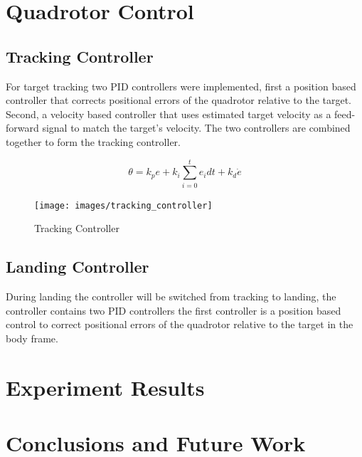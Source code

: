 \documentclass[letterpaper, 10 pt, conference]{ieeeconf}
\begin{document}
\section{Quadrotor Control}

\subsection{Tracking Controller}
For target tracking two PID controllers were implemented, first a position
based controller that corrects positional errors of the quadrotor relative
to the target. Second, a velocity based controller that uses estimated
target velocity as a feed-forward signal to match the target's velocity.
The two controllers are combined together to form the tracking controller.

\begin{equation}
   \theta = k_{p} e + k_{i} \sum_{i = 0}^{t} e_{i} dt + k_{d} \dot{e}
\end{equation}

\begin{figure}
\label{fig:tracking_controller}
  \texttt{[image: images/tracking\_controller]}
  \caption{Tracking Controller}
\end{figure}

\subsection{Landing Controller}
During landing the controller will be switched from tracking to landing,
the controller contains two PID controllers the first controller is
a position based control to correct positional errors of the quadrotor
relative to the target in the body frame.




\section{Experiment Results}



\section{Conclusions and Future Work}



\end{document}
